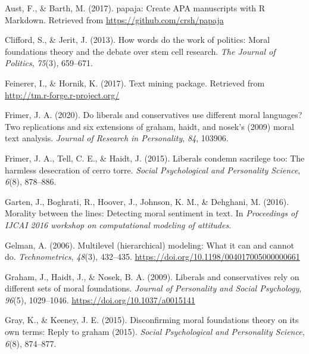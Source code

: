 \documentclass[
  english,
  man]{apa6}
\newlength{\cslhangindent}
\newlength{\cslentryspacingunit} %
\newenvironment{CSLReferences}[2] %
 {%
  \setlength{\parindent}{0pt}
  \ifodd #1
  \let\oldpar\par
  \def\par{\hangindent=\cslhangindent\oldpar}
  \fi
  \setlength{\parskip}{#2\cslentryspacingunit}
 }%
 {}
\begin{document}
\hypertarget{refs}{}
\begin{CSLReferences}{1}{0}
\leavevmode{}%
Aust, F., \& Barth, M. (2017). {papaja: Create APA manuscripts with R Markdown.} Retrieved from \url{https://github.com/crsh/papaja}

\leavevmode{}%
Clifford, S., \& Jerit, J. (2013). How words do the work of politics: Moral foundations theory and the debate over stem cell research. \emph{The Journal of Politics}, \emph{75}(3), 659--671.

\leavevmode{}%
Feinerer, I., \& Hornik, K. (2017). {Text mining package}. Retrieved from \url{http://tm.r-forge.r-project.org/}

\leavevmode{}%
Frimer, J. A. (2020). Do liberals and conservatives use different moral languages? Two replications and six extensions of graham, haidt, and nosek's (2009) moral text analysis. \emph{Journal of Research in Personality}, \emph{84}, 103906.

\leavevmode{}%
Frimer, J. A., Tell, C. E., \& Haidt, J. (2015). Liberals condemn sacrilege too: The harmless desecration of cerro torre. \emph{Social Psychological and Personality Science}, \emph{6}(8), 878--886.

\leavevmode{}%
Garten, J., Boghrati, R., Hoover, J., Johnson, K. M., \& Dehghani, M. (2016). Morality between the lines: Detecting moral sentiment in text. In \emph{Proceedings of IJCAI 2016 workshop on computational modeling of attitudes}.

\leavevmode{}%
Gelman, A. (2006). {Multilevel (hierarchical) modeling: What it can and cannot do}. \emph{Technometrics}, \emph{48}(3), 432--435. \url{https://doi.org/10.1198/004017005000000661}

\leavevmode{}%
Graham, J., Haidt, J., \& Nosek, B. A. (2009). {Liberals and conservatives rely on different sets of moral foundations.} \emph{Journal of Personality and Social Psychology}, \emph{96}(5), 1029--1046. \url{https://doi.org/10.1037/a0015141}

\leavevmode{}%
Gray, K., \& Keeney, J. E. (2015). Disconfirming moral foundations theory on its own terms: Reply to graham (2015). \emph{Social Psychological and Personality Science}, \emph{6}(8), 874--877.


\end{CSLReferences}
\end{document}
